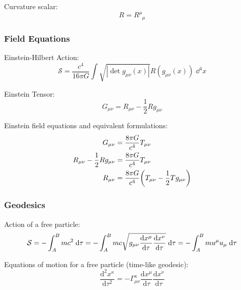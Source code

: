 			\noindent
			Curvature scalar:
			\begin{equation}
				R = R^\mu_{\phantom{\mu}\mu}
			\end{equation}

		\subsubsection{Field Equations}
			\noindent
			Einstein-Hilbert Action:
			\begin{equation}
				\mathcal{S} = \frac{c^4}{16\pi G} \int \sqrt{\left|\det{g_{\mu\nu}(x)}\right|} R(g_{\mu\nu}(x))\;\dd^4 x
			\end{equation}
			
			Einstein Tensor:
			\begin{equation}
				G_{\mu\nu} = R_{\mu\nu} - \frac{1}{2} R g_{\mu\nu}
			\end{equation}			

			\noindent
			Einstein field equations and equivalent formulations:
			\begin{equation}
				\begin{aligned}
					G_{\mu\nu} &= \frac{8\pi G}{c^4} T_{\mu\nu} \\
					R_{\mu\nu} - \frac{1}{2} R g_{\mu\nu} &= \frac{8\pi G}{c^4} T_{\mu\nu} \\
					R_{\mu\nu} &= \frac{8\pi G}{c^4} \qty( T_{\mu\nu} - \frac{1}{2} T g_{\mu\nu} ) \\
				\end{aligned}
			\end{equation}

		\subsubsection{Geodesics}
			\noindent
			Action of a free particle:
			\begin{equation}
				\mathcal{S} = -\int_A^B mc^2\;\dd \tau 
				= -\int_A^B mc\sqrt{g_{\mu\nu} \dv{x^\mu}{\tau} \dv{x^\nu}{\tau}} \;\dd \tau  
				= -\int_A^B m u^\mu u_\mu \;\dd \tau
			\end{equation}

			\noindent
			Equations of motion for a free particle (time-like geodesic):
			\begin{equation}
				\frac{\mathrm{d}^2 x^\kappa}{\mathrm{d}\tau^2}=-\Gamma_{\mu\nu}^{\kappa}\frac{\mathrm{d}x^\mu}{\mathrm{d}\tau}\frac{\mathrm{d}x^\nu}{\mathrm{d}\tau}
			\end{equation}


